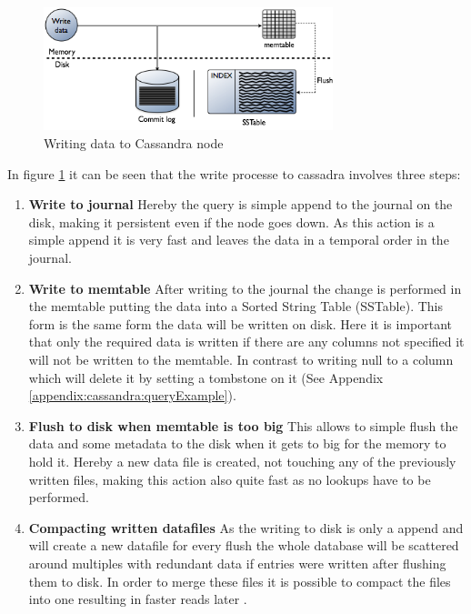 \begin{figure}[ht]
    \centering
    \includegraphics[width=0.75\textwidth]{img/cassandra_local_write.png}
    \caption{Writing data to Cassandra node \autocite{datastaxWriteData}}
    \label{fig:cassandra:writeData}
\end{figure}
In figure \ref{fig:cassandra:writeData} it can be seen that the write processe to cassadra involves three steps:
\begin{enumerate}
\item \textbf{Write to journal} Hereby the query is simple append to the journal on the disk, making it persistent even if the node goes down. As this action is a simple append it is very fast and leaves the data in a temporal order in the journal.
\item \textbf{Write to memtable} After writing to the journal the change is performed in the memtable putting the data into a Sorted String Table (SSTable). This form is the same form the data will be written on disk. Here it is important that only the required data is written if there are any columns not specified it will not be written to the memtable. In contrast to writing null to a column which will delete it by setting a tombstone on it (See Appendix \ref{appendix:cassandra:queryExample}).
\item \textbf{Flush to disk when memtable is too big} This allows to simple flush the data and some metadata to the disk when it gets to big for the memory to hold it. Hereby a new data file is created, not touching any of the previously written files, making this action also quite fast as no lookups have to be performed.
\item \textbf{Compacting written datafiles} As the writing to disk is only a append and will create a new datafile for every flush the whole database will be scattered around multiples with redundant data if entries were written after flushing them to disk. In order to merge these files it is possible to compact the files into one resulting in faster reads later \autocite{cassandraCompactTool}.
\end{enumerate}

